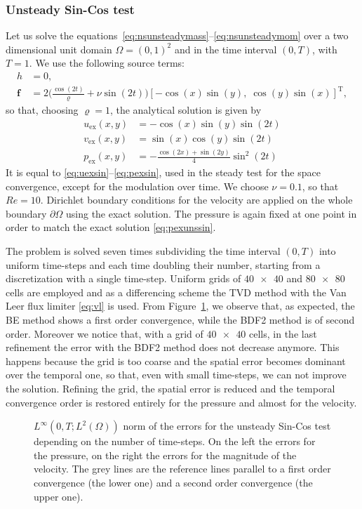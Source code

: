 \subsubsection{Unsteady Sin-Cos test}
Let us solve the equations~\eqref{eq:nsunsteadymass}--\eqref{eq:nsunsteadymom} 
over a two dimensional unit domain $\Omega=(0,1)^2$ and in the time interval 
$(0,T)$, with $T=1$. We use the following source terms:
\begin{align}
h &= 0,\\
\mathbf{f} &= 2\Big(\frac{\cos(2t)}{\varrho} + \nu \sin(2t)\Big)[- \cos(x) 
\sin(y), \; 
\cos(y) \sin(x)]^\mathrm{T},
\end{align}
so that, choosing $\varrho=1$, the analytical solution is given by
\begin{align}
\label{eq:uexunssin}	u_\text{ex}(x,y) &= -\cos(x)\sin(y)\sin(2t)\\
v_\text{ex}(x,y) &= \sin(x)\cos(y)\sin(2t)\\
\label{eq:pexunssin}	p_\text{ex}(x,y) &= 
-\frac{\cos(2x)+\sin(2y)}{4}\sin^2(2t)
\end{align}
It is equal to \eqref{eq:uexsin}--\eqref{eq:pexsin}, used in the steady test 
for the space convergence, except for the modulation over time. We choose 
$\nu=0.1$, so that $Re=10$. Dirichlet boundary conditions for the velocity are 
applied on the whole boundary $\partial \Omega$ using the exact solution. 
The pressure is again fixed  at one point in order to match the exact solution 
\eqref{eq:pexunssin}.

The problem is solved seven times subdividing the time interval $(0,T)$ into 
uniform time-steps and each time doubling their number, starting from a 
discretization with a
single time-step. Uniform grids of $\num{40x40}$ and $\num{80x80}$ cells are 
employed and as a differencing scheme the TVD method with the Van Leer flux 
limiter \eqref{eq:vl} is used. From Figure~\ref{fig:timeerr}, we observe that, 
as expected, the BE method shows a first order convergence, while the BDF2 
method is of second order. Moreover we notice that, with a grid of 
$\num{40x40}$ cells, in the last refinement the error with the BDF2 method does 
not decrease anymore. This happens because the grid is too coarse and the 
spatial error becomes dominant over the temporal one, so that, even with small 
time-steps, we can not improve the solution.
Refining the grid, the spatial error is reduced and the temporal convergence 
order is restored entirely for the pressure and almost for the velocity.
\begin{figure}
	\centering
	\subfloat{}
	\subfloat{}
	\caption[$L^\infty(0,T;L^2(\Omega))$ norm of the errors for the unsteady 
	Sin-Cos 
	test]{$L^\infty(0,T;L^2(\Omega))$ norm of the errors for the unsteady 
	Sin-Cos test 
	depending on the number of time-steps. On the left the errors for the 
	pressure, on the right the errors for the magnitude of the velocity. The grey lines are the reference lines parallel to a first order convergence (the lower one) and a
	second order convergence (the upper one).}
	\label{fig:timeerr}
\end{figure}
%
